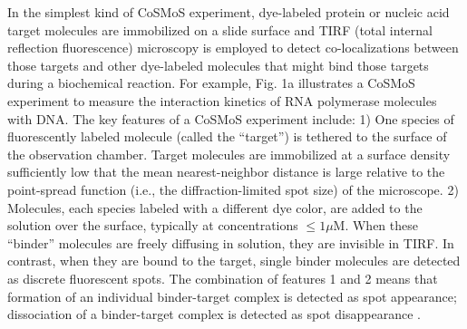 In the simplest kind of CoSMoS experiment, dye-labeled protein or nucleic acid target molecules are immobilized on a slide surface and TIRF (total internal reflection fluorescence) microscopy is employed to detect co-localizations between those targets and other dye-labeled molecules that might bind those targets during a biochemical reaction. For example, Fig. 1a illustrates a CoSMoS experiment to measure the interaction kinetics of RNA polymerase molecules with DNA. The key features of a CoSMoS experiment include: 1) One species of fluorescently labeled molecule (called the “target”) is tethered to the surface of the observation chamber. Target molecules are immobilized at a surface density sufficiently low that the mean nearest-neighbor distance is large relative to the point-spread function (i.e., the diffraction-limited spot size) of the microscope. 2) Molecules, each species labeled with a different dye color, are added to the solution over the surface, typically at concentrations $\leq 1 \mu$M. When these “binder” molecules are freely diffusing in solution, they are invisible in TIRF. In contrast, when they are bound to the target, single binder molecules are detected as discrete fluorescent spots. The combination of features 1 and 2 means that formation of an individual binder-target complex is detected as spot appearance; dissociation of a binder-target complex is detected as spot disappearance \cite{Friedman2006-kb, Friedman2015-nx}.

